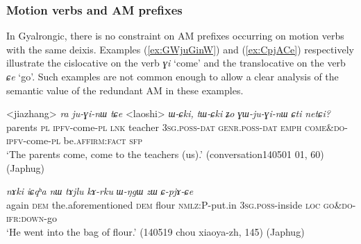 \documentclass[oneside,a4paper,11pt]{article}
\newcommand{\ipa}[1]{{\phon\textit{#1}}}
\newcommand{\japhug}[2]{\textit{\phon#1} `#2'}
\newcommand{\sens}[1]{‘#1’}
\newcommand{\rouge}[1]{{\color{red}#1}}
\begin{document}
%
 

\subsubsection{Motion verbs and AM prefixes}
In Gyalrongic, there is no constraint on AM prefixes occurring on motion verbs with the same deixis. Examples (\ref{ex:GWjuGinW}) and (\ref{ex:CpjACe}) respectively illustrate the cislocative on the verb \japhug{ɣi}{come} and the translocative on the verb \japhug{ɕe}{go}. Such examples are not common enough to allow a clear analysis of the semantic value of the redundant AM in these examples.

\begin{exe}
\ex \label{ex:GWjuGinW}
 \gll <jiazhang> \ipa{ra}	\ipa{ju-ɣi-nɯ}	\ipa{tɕe}  <laoshi> \ipa{ɯ-ɕki,}	\ipa{tɯ-ɕki}	\ipa{ʑo}	\ipa{\rouge{ɣɯ}-ju-ɣi-nɯ}	\ipa{ɕti}	\ipa{netɕi?}  \\
 parents \textsc{pl} \textsc{ipfv}-come-\textsc{pl} \textsc{lnk} teacher \textsc{3sg}.\textsc{poss}-\textsc{dat} \textsc{genr}.\textsc{poss}-\textsc{dat} \textsc{emph} \rouge{\textsc{come\&do}}-\textsc{ipfv}-come-\textsc{pl} be.\textsc{affirm}:\textsc{fact} \textsc{sfp} \\
 \glt `The parents come, come to the teachers (us).' (conversation140501 01, 60) (Japhug)
\end{exe}

\begin{exe}
\ex \label{ex:CpjACe}
 \gll \ipa{li}	\ipa{nɤki}	\ipa{iɕqʰa}	\ipa{nɯ}	\ipa{tɤjlu}	\ipa{kɤ-rku}	\ipa{ɯ-ŋgɯ}	\ipa{zɯ}	\ipa{\rouge{ɕ}-pjɤ-ɕe} \\
 again \textsc{dem} the.aforementioned \textsc{dem} flour \textsc{nmlz}:P-put.in \textsc{3sg}.\textsc{poss}-inside \textsc{loc} \rouge{\textsc{go\&do}}-\textsc{ifr}:\textsc{down}-go \\
 \glt `He went into the bag of flour.' (140519 chou xiaoya-zh, 145) (Japhug)
\end{exe}
\end{document}
